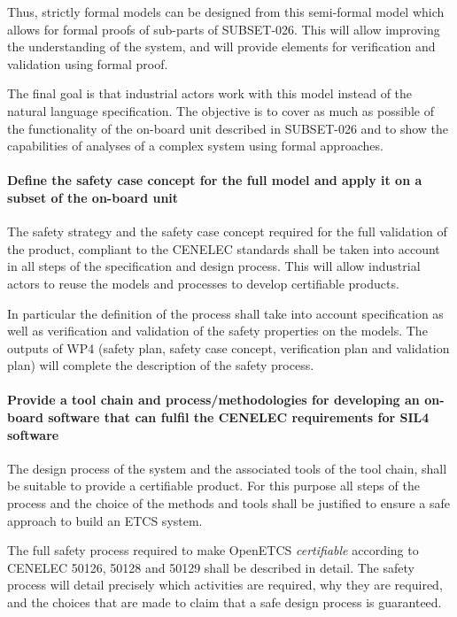 Thus, strictly formal models can be designed from this semi-formal model which allows for formal proofs of sub-parts of SUBSET-026. This will allow improving the understanding of the system, and will provide elements for verification and validation using formal proof.

The final goal is that industrial actors work with this model instead of the
natural language specification.
The objective is to cover as much as possible of the  functionality of the on-board unit described in SUBSET-026 and to show the capabilities of analyses of a complex system using formal approaches.

\paragraph{Define the safety case concept for the full model and apply it on a subset of the on-board unit}
The safety strategy and the safety case concept required for the full validation of the product, compliant to the CENELEC standards shall be taken into account in all steps of the specification and design process. This will allow industrial actors to reuse the models and processes to develop certifiable products.

In particular the definition of the process shall take into account specification as well as verification and validation of the safety properties on the models. The outputs of WP4 (safety plan, safety case concept, verification plan and validation plan) will complete the description of the safety process.


\paragraph{Provide a tool chain and process/methodologies for developing
an on-board software that can fulfil the CENELEC requirements for SIL4 software}

The design process of the system and the associated tools of the tool chain, shall be suitable to provide a certifiable product. For this purpose all steps of the process and the choice of the methods and tools shall be justified to ensure a safe approach to build an ETCS system.

The full safety process required to make OpenETCS \emph{certifiable} according to CENELEC 50126, 50128 and 50129 shall be described in detail. The safety process will detail precisely which activities are required, why they are required, and the choices that are made to claim that a safe design process is guaranteed.

